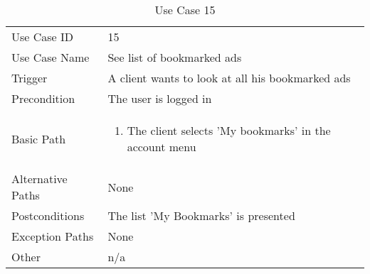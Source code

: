 \begin{table}[H]
\centering
\label{table-use-case-15}
\begin{tabular}{|p{3cm}|p{10cm}}
Use Case ID       & 15                                                           
\\
Use Case Name     & See list of bookmarked ads                                                         
\\
Trigger           & A client wants to look at all his bookmarked ads                                          
\\
Precondition      & The user is logged in                                                
\\
Basic Path        & \begin{enumerate}
\item The client selects 'My bookmarks' in the account menu
\end{enumerate} 
     \\
Alternative Paths & None                          \\
Postconditions    & The list 'My Bookmarks' is presented
\\
Exception Paths   & None                          \\
Other             & n/a                                                                                                                                                                                                        
\end{tabular}
\caption{Use Case 15}
\end{table}


